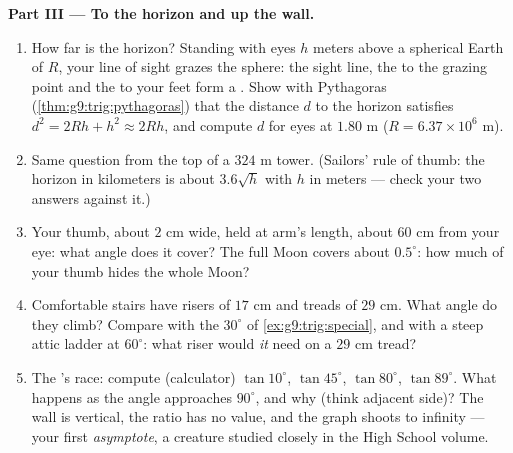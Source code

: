 \begin{problem}
\medskip
\noindent\textbf{Part III --- To the horizon and up the wall.}
\begin{enumerate}[resume]
  \item How far is the horizon? Standing with eyes $h$ meters
        above a spherical Earth of  $R$, your line of
        sight grazes the sphere: the sight line, the  to
        the grazing point and the  to your feet form a
        . Show with Pythagoras
        (\cref{thm:g9:trig:pythagoras}) that the distance $d$ to
        the horizon satisfies $d^2 = 2Rh + h^2 \approx 2Rh$,
        and compute $d$ for eyes at $1.80$ m
        ($R = 6.37 \times 10^6$ m).
  \item Same question from the top of a $324$ m tower. (Sailors'
        rule of thumb: the horizon in kilometers is about
        $3.6\sqrt{h}$ with $h$ in meters --- check your two
        answers against it.)
  \item Your thumb, about $2$ cm wide, held at arm's length,
        about $60$ cm from your eye: what angle does it cover?
        The full Moon covers about $0.5^\circ$: how much of your
        thumb hides the whole Moon?
  \item Comfortable stairs have risers of $17$ cm and treads of
        $29$ cm. What angle do they climb? Compare with the
        $30^\circ$ of \cref{ex:g9:trig:special}, and with a
        steep attic ladder at $60^\circ$: what riser would
        \emph{it} need on a $29$ cm tread?
  \item The 's race: compute (calculator)
        $\tan 10^\circ$, $\tan 45^\circ$, $\tan 80^\circ$,
        $\tan 89^\circ$. What happens as the angle approaches
        $90^\circ$, and why (think adjacent side)? The wall is
        vertical, the ratio has no value, and the graph shoots
        to infinity --- your first \emph{asymptote}, a creature
        studied closely in the High School volume.
\end{enumerate}
\end{problem}
